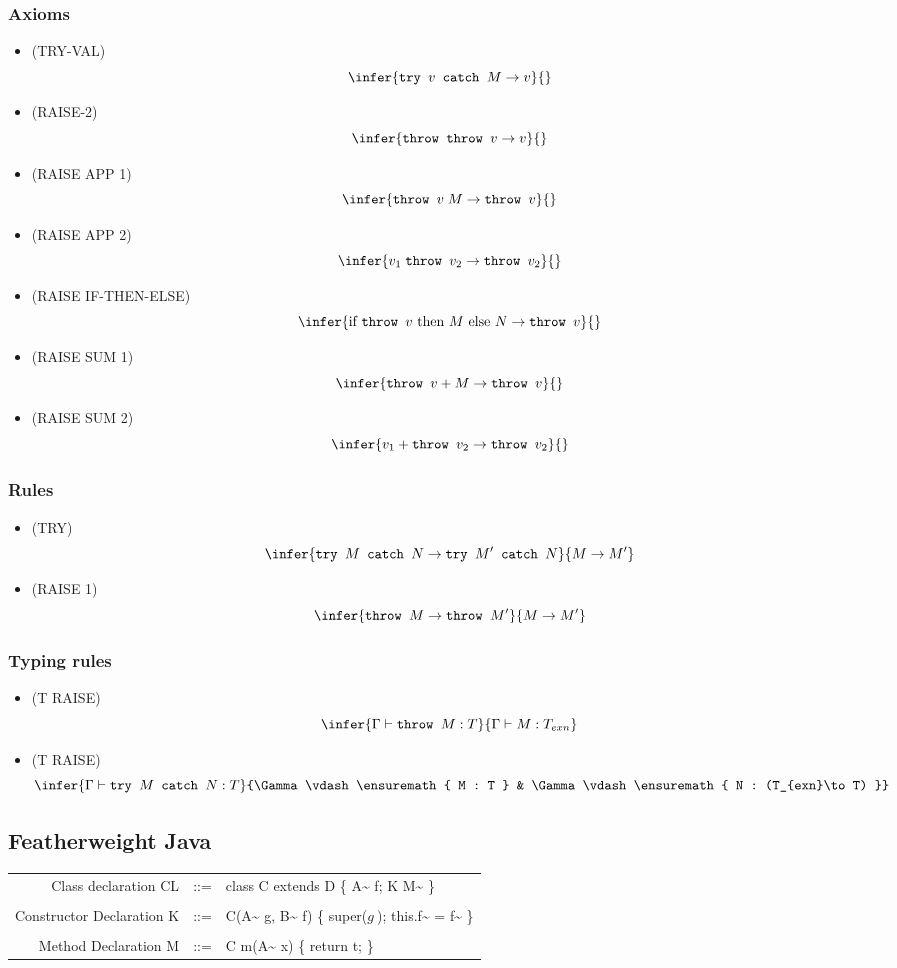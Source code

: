 \documentclass[11pt]{article}
\newcommand{\ifc}[3]{\ensuremath{\text{if } #1 \text{ then } #2 \text{ else } #3}}
\newcommand{\app}[2]{\ensuremath{ #1 \; #2}}
\newcommand{\type}[2]{\ensuremath{ #1 : #2 }}
\newcommand{\throw}[1]{\ensuremath{\texttt{throw } #1}}
\newcommand{\tc}[2]{\ensuremath{\texttt{try } #1 \texttt{ catch } #2}}
\begin{document}
\subsubsection*{Axioms}
\label{sec:org95db2da}
\begin{itemize}
\item (TRY-VAL) \[\infer{\tc{v}{M}\to v}{}\]
\item (RAISE-2) \[\infer{\throw{\throw{v}} \to v}{}\]
\item (RAISE APP 1) \[\infer{\app{\throw{v}}{M} \to \throw{v}}{}\]
\item (RAISE APP 2) \[\infer{\app{v_1}{\throw{v_2}} \to
      \throw{v_2}}{}\]
\item (RAISE IF-THEN-ELSE) \[\infer{\ifc{\throw{v}}{M}{N}\to
      \throw{v}}{}\]
\item (RAISE SUM 1) \[\infer{\throw{v} + M \to \throw{v}}{}\]
\item (RAISE SUM 2) \[\infer{v_1 + \throw{v_2} \to \throw{v_2}}{}\]
\end{itemize}
\subsubsection*{Rules}
\label{sec:org4bc0b88}
\begin{itemize}
\item (TRY) \[\infer{\tc{M}{N} \to \tc{M'}{N}}{M\to M'}\]
\item (RAISE 1) \[\infer{\throw{M} \to \throw{M'}}{M\to M'}\]
\end{itemize}
\subsubsection*{Typing rules}
\label{sec:org568c11d}
\begin{itemize}
\item (T RAISE) \[\infer{\Gamma\vdash \type{\throw{M}}{T}}
      {\Gamma\vdash \type{M}{T_{exn}}}\]
\item (T RAISE)
\[\infer{\Gamma\vdash\type{\tc{M}{N}}{T}}{\Gamma\vdash\type{M}{T}
      & \Gamma\vdash \type{N}{(T_{exn}\to T)}}\]
\end{itemize}
\subsection*{Featherweight Java}
\label{sec:orgb3c980b}
\begin{center}
\begin{tabular}{rcl}
Class declaration CL & ::= & class C extends D \{ A\textasciitilde{} f; K M\textasciitilde{} \}\\
 &  & \\
Constructor Declaration K & ::= & C(A\textasciitilde{} g, B\textasciitilde{} f) \{ super(\(g~\)); this.f\textasciitilde{} = f\textasciitilde{} \}\\
 &  & \\
Method Declaration M & ::= & C m(A\textasciitilde{} x) \{ return t; \}\\
\end{tabular}

\end{center}
\end{document}
